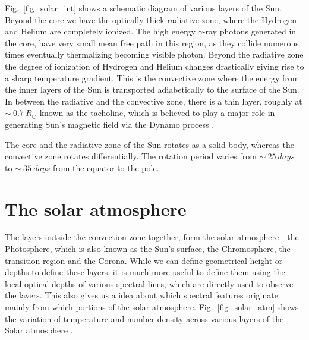 Fig.~\ref{fig_solar_int} shows a schematic diagram of various layers of the Sun. Beyond the core we have the optically thick radiative zone, where the Hydrogen and Helium are completely ionized. The high energy $\gamma$-ray photons generated in the core, have very small mean free path in this region, as they collide numerous times eventually thermalizing becoming visible photon. Beyond the radiative zone the degree of ionization of Hydrogen and Helium changes drastically giving rise to a sharp temperature gradient. This is the convective zone where the energy from the inner layers of the Sun is transported adiabetically to the surface of the Sun. In between the radiative and the convective zone, there is a thin layer, roughly at $\sim~0.7~R_{\odot}$ known as the tacholine, which is believed to play a major role in generating Sun's magnetic field via the Dynamo process \citep{corbard01}. 

The core and the radiative zone of the Sun rotates as a solid body, whereas the convective zone rotates differentially. The rotation period varies from $\sim~25~days$ to $\sim~35~days$ from the equator to the pole.

\section{The solar atmosphere}\label{solar_atmos}

The layers outside the convection zone together, form the solar atmosphere - the Photosphere, which is also known as the Sun's surface, the Chromosphere, the transition region and the Corona. While we can define geometrical height or depths to define these layers, it is much more useful to define them using the local optical depths of various spectral lines, which are directly used to observe the layers. This also gives us a idea about which spectral features originate mainly from which portions of the solar atmosphere. Fig.~\ref{fig_solar_atm} shows the variation of temperature and number density across various layers of the Solar atmosphere .

